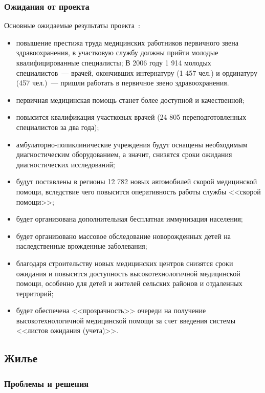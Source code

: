 \documentclass[article, 12pt, russian, oneside]{ncc}
\begin{document}
\subsubsection{Ожидания от проекта}

Основные ожидаемые результаты проекта~\cite{Health_Waitings}:

\begin{itemize}
\item повышение престижа труда медицинских работников первичного звена
  здравоохранения, в участковую службу должны прийти молодые
  квалифицированные специалисты; В 2006 году 1 914 молодых
  специалистов~--- врачей, окончивших интернатуру (1 457 чел.) и
  ординатуру (457 чел.)~--- пришли работать в первичное звено
  здравоохранения.
\item первичная медицинская помощь станет более доступной и
  качественной;
\item повысится квалификация участковых врачей (24 805
  переподготовленных специалистов за два года);
\item амбулаторно-поликлинические учреждения будут оснащены
  необходимым диагностическим оборудованием, а значит, снизятся сроки
  ожидания диагностических исследований;
\item будут поставлены в регионы 12 782 новых автомобилей скорой
  медицинской помощи, вследствие чего повысится оперативность работы
  службы <<скорой помощи>>;
\item будет организована дополнительная бесплатная иммунизация
  населения;
\item будет организовано массовое обследование новорожденных детей на
  наследственные врожденные заболевания;
\item благодаря строительству новых медицинских центров снизятся сроки
  ожидания и повысится доступность высокотехнологичной медицинской
  помощи, особенно для детей и жителей сельских районов и отдаленных
  территорий;
\item будет обеспечена <<прозрачность>> очереди на получение
  высокотехнологичной медицинской помощи за счет введения системы
  <<листов ожидания (учета)>>.
\end{itemize}

\subsection{Жилье}

\subsubsection{Проблемы и решения}
\end{document}

